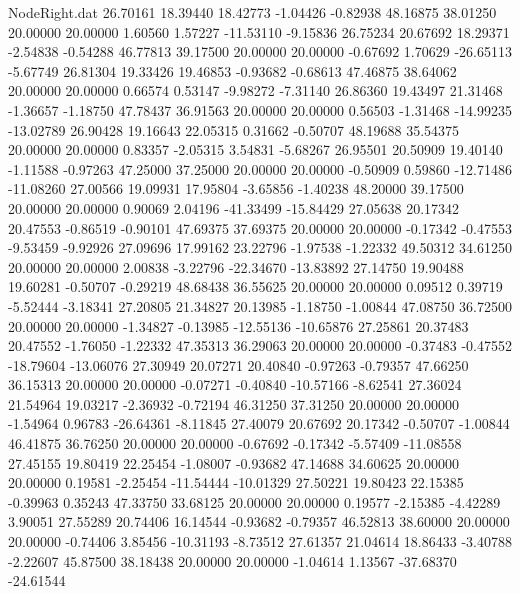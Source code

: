 \begin{filecontents}{NodeRight.dat}
  26.70161   18.39440   18.42773    -1.04426   -0.82938   48.16875   38.01250   20.00000   20.00000    1.60560    1.57227  -11.53110   -9.15836
  26.75234   20.67692   18.29371    -2.54838   -0.54288   46.77813   39.17500   20.00000   20.00000   -0.67692    1.70629  -26.65113   -5.67749
  26.81304   19.33426   19.46853    -0.93682   -0.68613   47.46875   38.64062   20.00000   20.00000    0.66574    0.53147   -9.98272   -7.31140
  26.86360   19.43497   21.31468    -1.36657   -1.18750   47.78437   36.91563   20.00000   20.00000    0.56503   -1.31468  -14.99235  -13.02789
  26.90428   19.16643   22.05315     0.31662   -0.50707   48.19688   35.54375   20.00000   20.00000    0.83357   -2.05315    3.54831   -5.68267
  26.95501   20.50909   19.40140    -1.11588   -0.97263   47.25000   37.25000   20.00000   20.00000   -0.50909    0.59860  -12.71486  -11.08260
  27.00566   19.09931   17.95804    -3.65856   -1.40238   48.20000   39.17500   20.00000   20.00000    0.90069    2.04196  -41.33499  -15.84429
  27.05638   20.17342   20.47553    -0.86519   -0.90101   47.69375   37.69375   20.00000   20.00000   -0.17342   -0.47553   -9.53459   -9.92926
  27.09696   17.99162   23.22796    -1.97538   -1.22332   49.50312   34.61250   20.00000   20.00000    2.00838   -3.22796  -22.34670  -13.83892
  27.14750   19.90488   19.60281    -0.50707   -0.29219   48.68438   36.55625   20.00000   20.00000    0.09512    0.39719   -5.52444   -3.18341
  27.20805   21.34827   20.13985    -1.18750   -1.00844   47.08750   36.72500   20.00000   20.00000   -1.34827   -0.13985  -12.55136  -10.65876
  27.25861   20.37483   20.47552    -1.76050   -1.22332   47.35313   36.29063   20.00000   20.00000   -0.37483   -0.47552  -18.79604  -13.06076
  27.30949   20.07271   20.40840    -0.97263   -0.79357   47.66250   36.15313   20.00000   20.00000   -0.07271   -0.40840  -10.57166   -8.62541
  27.36024   21.54964   19.03217    -2.36932   -0.72194   46.31250   37.31250   20.00000   20.00000   -1.54964    0.96783  -26.64361   -8.11845
  27.40079   20.67692   20.17342    -0.50707   -1.00844   46.41875   36.76250   20.00000   20.00000   -0.67692   -0.17342   -5.57409  -11.08558
  27.45155   19.80419   22.25454    -1.08007   -0.93682   47.14688   34.60625   20.00000   20.00000    0.19581   -2.25454  -11.54444  -10.01329
  27.50221   19.80423   22.15385    -0.39963    0.35243   47.33750   33.68125   20.00000   20.00000    0.19577   -2.15385   -4.42289    3.90051
  27.55289   20.74406   16.14544    -0.93682   -0.79357   46.52813   38.60000   20.00000   20.00000   -0.74406    3.85456  -10.31193   -8.73512
  27.61357   21.04614   18.86433    -3.40788   -2.22607   45.87500   38.18438   20.00000   20.00000   -1.04614    1.13567  -37.68370  -24.61544

\end{filecontents}
